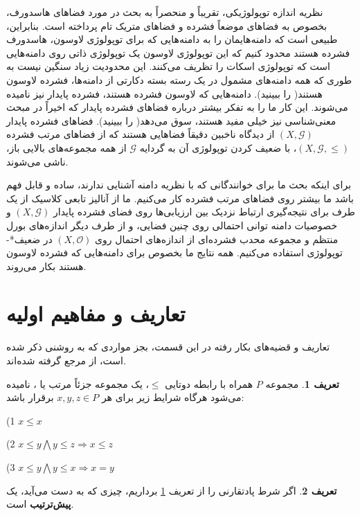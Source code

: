 \documentclass[12pt,a4paper]{article}
\theoremstyle{definition}
\newtheorem{definition}{تعریف}[section]
\theoremstyle{theorem}
\theoremstyle{definition}
\begin{document}
 نظریه اندازه توپولوژیکی،  
 تقریباً و منحصراً به بحث در مورد فضاهای هاسدورف، بخصوص به فضاهای موضعاً فشرده و فضاهای متریک تام پرداخته است. بنابراین،  طبیعی است که دامنه‌هایمان را به دامنه‌هایی که برای توپولوژی لاوسون، هاسدورف فشرده هستند محدود کنیم که این توپولوژی لاوسون یک توپولوژی ذاتی روی دامنه‌هایی است که توپولوژی اسکات را تظریف می‌کنند. این محدودیت زیاد سنگین نیست به طوری که همه دامنه‌های مشمول در یک رسته بسته دکارتی از دامنه‌ها، فشرده لاوسون هستند(\cite{Jung}  
  را ببینید). دامنه‌هایی که لاوسون فشرده هستند، فشرده پایدار نیز نامیده می‌شوند. این کار ما را به تفکر بیشتر درباره فضاهای فشرده پایدار که اخیراً در مبحث معنی‌شناسی نیز خیلی مفید هستند،  سوق می‌دهد(\cite{Kegelmann}  
را ببینید). فضاهای فشرده پایدار
 $ \left( X,\mathcal{G}\right)  $
 از دیدگاه
  ناخبین\cite{Nachbin}
 دقیقاً فضاهایی هستند که از فضاهای مرتب فشرده 
 $\left( X,\mathcal{G},\leq\right)$، با ضعیف کردن توپولوژی آن به گردایه 
 $\mathcal{G}  $
 از همه مجموعه‌های بالایی باز، ناشی می‌شوند.
 
 برای اینکه بحث ما برای خوانندگانی که با نظریه دامنه آشنایی ندارند، ساده و قابل فهم باشد ما بیشتر روی  فضاهای مرتب فشرده کار می‌کنیم. ما از آنالیز تابعی کلاسیک از یک طرف برای نتیجه‌گیری ارتباط نزدیک بین ارزیابی‌ها روی فضای فشرده پایدار 
 $ \left( X,\mathcal{G}\right)  $
 و خصوصیات دامنه توانی احتمالی روی چنین فضایی،  و از طرف دیگر اندازه‌های بورل منتظم و مجموعه محدب فشرده‌ای از اندازه‌های احتمال روی 
 $ \left( X,\mathcal{O}\right)  $
 در ضعیف*-توپولوژی استفاده می‌کنیم.  همه نتایج ما بخصوص برای دامنه‌هایی که فشرده لاوسون هستند بکار می‌روند.
 

\section{تعاریف و مفاهیم اولیه}
تعاریف و قضیه‌های بکار رفته در این قسمت، بجز مواردی که به روشنی ذکر شده است، از مرجع 
\cite{abramsky2}
گرفته شده‌اند.
\begin{definition}\label{d1} 
مجموعه 
$ P $
همراه با رابطه دوتایی 
$ \leq $، یک مجموعه جزئاً مرتب یا
،  نامیده می‌شود هرگاه شرایط زیر برای هر 
$ x,y,z \in P$
برقرار باشد:
\begin{LTR}
\begin{description}
\item{(1}   
$ x\leq x  $  \ \ \   
\item{(2}
$ x\leq y \bigwedge y\leq z \Longrightarrow x\leq z $ \ \ \  
\item{(3}
$ x\leq y \bigwedge y \leq x \Longrightarrow x=y  $\ \ \ 
\end{description}
\end{LTR}
\end{definition}
\begin{definition}
اگر شرط پادتقارنی را از تعریف
\ref{d1}
برداریم، چیزی که به دست می‌آید، یک \textbf{پیش‌ترتیب}
است.
\end{definition}
\end{document}
